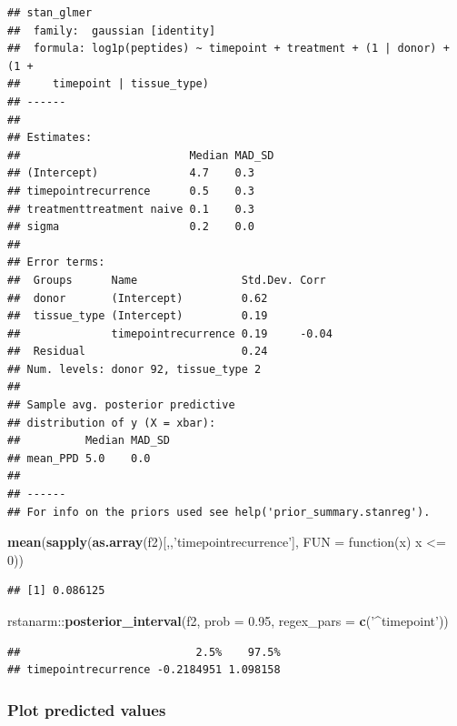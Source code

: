 \documentclass[]{article}
\newenvironment{Shaded}{\begin{snugshade}}{\end{snugshade}}
\newcommand{\KeywordTok}[1]{\textcolor[rgb]{0.13,0.29,0.53}{\textbf{{#1}}}}
\newcommand{\DataTypeTok}[1]{\textcolor[rgb]{0.13,0.29,0.53}{{#1}}}
\newcommand{\DecValTok}[1]{\textcolor[rgb]{0.00,0.00,0.81}{{#1}}}
\newcommand{\FloatTok}[1]{\textcolor[rgb]{0.00,0.00,0.81}{{#1}}}
\newcommand{\StringTok}[1]{\textcolor[rgb]{0.31,0.60,0.02}{{#1}}}
\newcommand{\NormalTok}[1]{{#1}}
\begin{document}
\begin{verbatim}
## stan_glmer
##  family:  gaussian [identity]
##  formula: log1p(peptides) ~ timepoint + treatment + (1 | donor) + (1 + 
##     timepoint | tissue_type)
## ------
## 
## Estimates:
##                          Median MAD_SD
## (Intercept)              4.7    0.3   
## timepointrecurrence      0.5    0.3   
## treatmenttreatment naive 0.1    0.3   
## sigma                    0.2    0.0   
## 
## Error terms:
##  Groups      Name                Std.Dev. Corr 
##  donor       (Intercept)         0.62          
##  tissue_type (Intercept)         0.19          
##              timepointrecurrence 0.19     -0.04
##  Residual                        0.24          
## Num. levels: donor 92, tissue_type 2 
## 
## Sample avg. posterior predictive 
## distribution of y (X = xbar):
##          Median MAD_SD
## mean_PPD 5.0    0.0   
## 
## ------
## For info on the priors used see help('prior_summary.stanreg').
\end{verbatim}

\begin{Shaded}
\begin{Highlighting}[]
\KeywordTok{mean}\NormalTok{(}\KeywordTok{sapply}\NormalTok{(}\KeywordTok{as.array}\NormalTok{(f2)[,,}\StringTok{'timepointrecurrence'}\NormalTok{], }\DataTypeTok{FUN =} \NormalTok{function(x) x <=}\StringTok{ }\DecValTok{0}\NormalTok{))}
\end{Highlighting}
\end{Shaded}

\begin{verbatim}
## [1] 0.086125
\end{verbatim}

\begin{Shaded}
\begin{Highlighting}[]
\NormalTok{rstanarm::}\KeywordTok{posterior_interval}\NormalTok{(f2, }\DataTypeTok{prob =} \FloatTok{0.95}\NormalTok{, }\DataTypeTok{regex_pars =} \KeywordTok{c}\NormalTok{(}\StringTok{'^timepoint'}\NormalTok{))}
\end{Highlighting}
\end{Shaded}

\begin{verbatim}
##                           2.5%    97.5%
## timepointrecurrence -0.2184951 1.098158
\end{verbatim}

\subsubsection{Plot predicted values}\label{plot-predicted-values}
\end{document}
